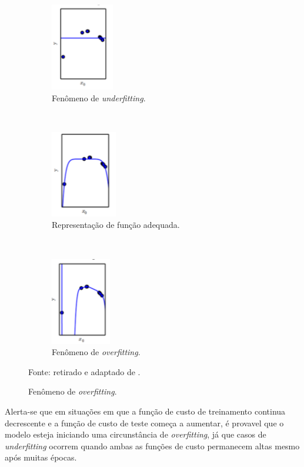 \begin{figure}[H]
   \caption{Fenômenos de \textit{underfitting} e \textit{overfitting}.}
   \centering
   \label{deep:fig:5}
    \begin{subfigure}[t]{0.45\textwidth}
        \centering
        \includegraphics[height=1.5in]{recursos/imagens/deep/under.png}
        \caption{Fenômeno de \textit{underfitting}.}
        \label{deep:fig:5.1}
    \end{subfigure}
    ~ 
    \begin{subfigure}[t]{0.45\textwidth}
        \centering
        \includegraphics[height=1.5in]{recursos/imagens/deep/apx.png}
        \caption{Representação de função adequada.}
        \label{deep:fig:5.2}
    \end{subfigure}
    ~
    \begin{subfigure}[t]{0.45\textwidth}
        \centering
        \includegraphics[height=1.5in]{recursos/imagens/deep/over.png}
        \caption{Fenômeno de \textit{overfitting}.}
        \label{deep:fig:5.3}
    \end{subfigure}

    Fonte: retirado e adaptado de \cite{Goodfellow2016}.
\end{figure}

Alerta-se que em situações em que a função de custo de treinamento continua decrescente e a função de custo de teste começa a aumentar, é provavel que o modelo esteja iniciando uma circunstância de \textit{overfitting}, já que casos de \textit{underfitting} ocorrem quando ambas as funções de custo permanecem altas mesmo após muitas épocas.

